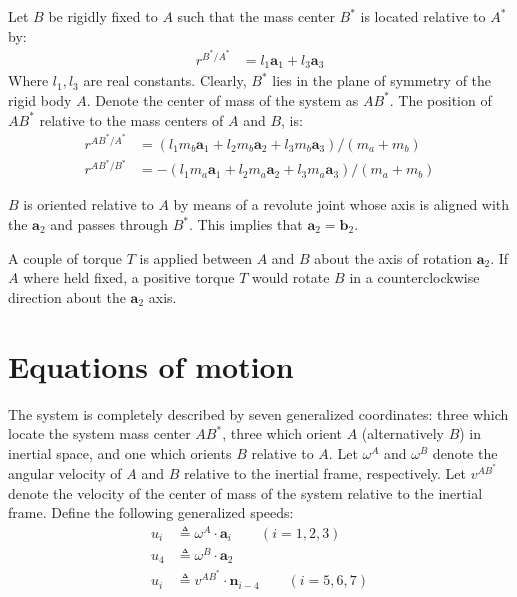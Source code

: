 \documentclass[letterpaper,11pt]{article}
\newcommand{\bs}[1]{ \boldsymbol{ #1 } }
\begin{document}
Let $B$ be rigidly fixed to $A$ such that the mass center $B^*$ is located
relative to $A^*$ by:
\begin{align*}
  r^{B^* / A^*} & = l_1 \bs{a}_1 + l_3 \bs{a}_3
\end{align*}
Where $l_1, l_3$ are real constants.  Clearly, $B^*$ lies in the plane of
symmetry of the rigid body $A$. Denote the center of mass of the system as
$AB^*$. The position of $AB^*$ relative to the mass centers of $A$ and $B$, is:
\begin{align*}
  r^{AB^* / A^*} & = (l_1 m_b\bs{a}_1 + l_2 m_b\bs{a}_2 + l_3
  m_b\bs{a}_3)/(m_a+m_b)\\
  r^{AB^* / B^*} & =  -(l_1 m_a\bs{a}_1 + l_2 m_a\bs{a}_2 + l_3
  m_a\bs{a}_3)/(m_a+m_b)
\end{align*}

$B$ is oriented relative to $A$ by means of a revolute joint whose axis is
aligned with the $\bs{a}_2$ and passes through $B^*$.  This implies that
$\bs{a}_2 = \bs{b}_2$.

A couple of torque $T$ is applied between $A$ and $B$ about the axis of rotation
$\bs{a}_2$.  If $A$ where held fixed, a positive torque $T$ would rotate $B$ in
a counterclockwise direction about the $\bs{a}_2$ axis.

\section*{Equations of motion}
The system is completely described by seven generalized coordinates: three which
locate the system mass center $AB^*$, three which orient $A$ (alternatively
$B$) in inertial space, and one which orients $B$ relative to $A$.  Let $\omega^A$ and
$\omega^B$ denote the angular velocity of $A$ and $B$ relative to the inertial
frame, respectively.  Let $v^{AB^*}$ denote the velocity of the center of mass
of the system relative to the inertial frame.  Define the following generalized
speeds:
\begin{align}
  u_i & \triangleq \omega^A \cdot \bs{a}_i  \qquad  (i = 1,2,3) \label{u_defs1} \\
  u_4 & \triangleq \omega^B \cdot \bs{a}_2 \label{u_defs2} \\
  u_i & \triangleq v^{AB^*} \cdot \bs{n}_{i-4} \qquad  (i = 5,6,7) \label{u_defs3}
\end{align}
\end{document}
